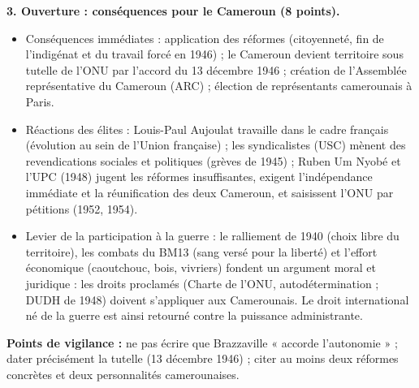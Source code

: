\documentclass[11pt]{article}
\begin{document}
\begin{corrige}
\textbf{3. Ouverture : conséquences pour le Cameroun (8 points).}
\begin{itemize}
\item[a.] Conséquences immédiates : application des réformes (citoyenneté, fin de l'indigénat et du travail forcé en 1946) ; le Cameroun devient territoire sous tutelle de l'ONU par l'accord du 13 décembre 1946 ; création de l'Assemblée représentative du Cameroun (ARC) ; élection de représentants camerounais à Paris.
\item[b.] Réactions des élites : Louis-Paul Aujoulat travaille dans le cadre français (évolution au sein de l'Union française) ; les syndicalistes (USC) mènent des revendications sociales et politiques (grèves de 1945) ; Ruben Um Nyobé et l'UPC (1948) jugent les réformes insuffisantes, exigent l'indépendance immédiate et la réunification des deux Cameroun, et saisissent l'ONU par pétitions (1952, 1954).
\item[c.] Levier de la participation à la guerre : le ralliement de 1940 (choix libre du territoire), les combats du BM13 (sang versé pour la liberté) et l'effort économique (caoutchouc, bois, vivriers) fondent un argument moral et juridique : les droits proclamés (Charte de l'ONU, autodétermination ; DUDH de 1948) doivent s'appliquer aux Camerounais. Le droit international né de la guerre est ainsi retourné contre la puissance administrante.
\end{itemize}
\textbf{Points de vigilance :} ne pas écrire que Brazzaville « accorde l'autonomie » ; dater précisément la tutelle (13 décembre 1946) ; citer au moins deux réformes concrètes et deux personnalités camerounaises.
\end{corrige}
\end{document}
